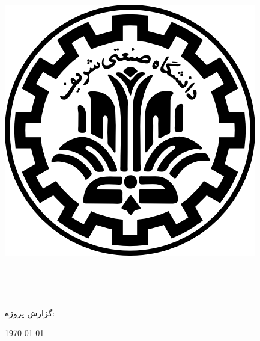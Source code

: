 
\pagestyle{empty}

\begin{center}

\includegraphics[scale=0.2]{front/template/images/logo.png}

\begin{large}

\vspace{-0.2cm}
\ThesisUniversity \\[0.7em]

\vspace{0.5cm}

\ThesisType \\
\ThesisMajor

\end{large}

\vspace{3cm}

{گزارش پروژه:}\\[1.2em]
{\large\textbf{\ThesisTitle}}

\vspace{3cm}

\vspace{0.7cm}

\vspace{1.3cm}

\today

\end{center}

\newpage
